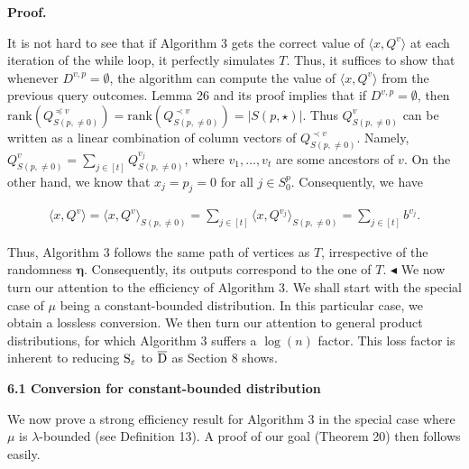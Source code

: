 



\par\medskip\noindent\textbf{Proof.}\par




It is not hard to see that if Algorithm 3 gets the correct value of $\langle x,Q^{v}\rangle$ at each iteration of the while loop, it perfectly simulates $T$. Thus, it suffices to show that whenever $D^{v,p}=\emptyset$, the algorithm can compute the value of $\langle x,Q^{v}\rangle$ from the previous query outcomes. Lemma 26 and its proof implies that if $D^{v,p}=\emptyset$, then $\mathrm{rank}(Q^{\preceq v}_{S(p,\neq 0)})=\mathrm{rank}(Q^{\prec v}_{S(p,\neq
0)})=|S(p,\star)|$. Thus $Q^{v}_{S(p,\neq 0)}$ can be written as a linear combination of column vectors of $Q^{\prec v}_{S(p,\neq 0)}$. Namely, $Q^{v}_{S(p,\neq 0)}=\sum_{j\in[t]}Q^{v_{j}}_{S(p,\neq 0)}$, where $v_{1},\ldots,v_{t}$ are some ancestors of $v$. On the other hand, we know that $x_{j}=p_{j}=0$ for all $j\in S^{p}_{0}$. Consequently, we have\par


\[\begin{gathered}
\langle x,Q^{v}\rangle=\langle x,Q^{v}\rangle_{S(p,\neq 0)}=\sum\nolimits_{j\in[t]}\langle x,Q^{v_{j}}\rangle_{S(p,\neq 0)}=\sum\nolimits_{j\in[t]}b^{v_{j}}.
\end{gathered}\]


Thus, Algorithm 3 follows the same path of vertices as $T$, irrespective of the randomness $\bm{\eta}$. Consequently, its outputs correspond to the one of $T$.
$\blacktriangleleft$
We now turn our attention to the efficiency of Algorithm 3. We shall start with the special case of $\mu$ being a constant-bounded distribution. In this particular case, we obtain a lossless conversion.
We then turn our attention to general product distributions, for which Algorithm 3 suffers a $\log(n)$ factor. This loss factor is inherent to reducing ${\textup{S}}_{\varepsilon}$ to $\overline{{\textup{D}}}$ as Section 8 shows.\par





\par\medskip\noindent\textbf{
6.1 Conversion for constant-bounded distribution}\par




We now prove a strong efficiency result for Algorithm 3 in the special case where $\mu$ is $\lambda$-bounded (see Definition 13). A proof of our goal (Theorem 20) then follows easily.\par



